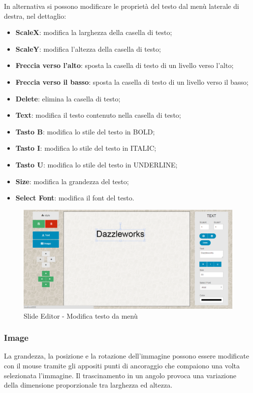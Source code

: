 \noindent In alternativa si possono modificare le proprietà del testo dal menù laterale di destra, nel dettaglio:
		
		\begin{itemize}
			\item \textbf{ScaleX}: modifica la larghezza della casella di testo;
			\item \textbf{ScaleY}: modifica l'altezza della casella di testo;
			\item \textbf{Freccia verso l'alto}: sposta la casella di testo di un livello verso l'alto;
			\item \textbf{Freccia verso il basso}: sposta la casella di testo di un livello verso il basso;
			\item \textbf{Delete}: elimina la casella di testo;
			\item \textbf{Text}: modifica il testo contenuto nella casella di testo;
			\item \textbf{Tasto B}: modifica lo stile del testo in BOLD;
			\item \textbf{Tasto I}: modifica lo stile del testo in ITALIC;
			\item \textbf{Tasto U}: modifica lo stile del testo in UNDERLINE;
			\item \textbf{Size}: modifica la grandezza del testo;
			\item \textbf{Select Font}: modifica il font del testo.
		\end{itemize}
		 \begin{figure}[h] 
		    \centering 
		    \includegraphics[scale=0.40] {img/text_edit.png}
		    \caption{Slide Editor - Modifica testo da menù} 
		\end{figure}
		
		
\newpage 

\subsubsection{Image}
La grandezza, la posizione e la rotazione dell'immagine possono essere modificate con il mouse tramite gli appositi punti di ancoraggio che compaiono una volta selezionata l'immagine. Il trascinamento in un angolo provoca una variazione della dimensione proporzionale tra larghezza ed altezza.

